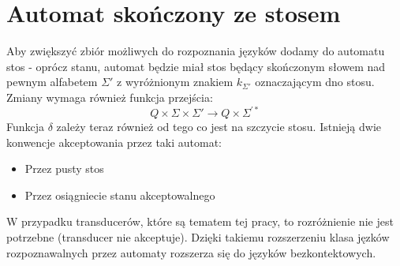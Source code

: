 \documentclass[declaration,shortabstract]{iithesis}
\theoremstyle{definition}
\theoremstyle{plain}
\begin{document}
\section{Automat skończony ze stosem}
Aby zwiększyć zbiór możliwych do rozpoznania języków dodamy do automatu stos - oprócz stanu, automat będzie miał stos będący skończonym słowem nad pewnym alfabetem \(\Sigma'\) z wyróżnionym znakiem \(k_{\Sigma'}\) oznaczającym dno stosu. Zmiany wymaga również funkcja przejścia:
$$ Q \times \Sigma \times \Sigma' \rightarrow  Q \times \Sigma^{'*}$$
Funkcja \( \delta \) zależy teraz również od tego co jest na szczycie stosu. Istnieją dwie konwencje akceptowania przez taki automat:
\begin{itemize}  
\item Przez pusty stos
\item Przez osiągniecie stanu akceptowalnego
\end{itemize}
W przypadku transducerów, które są tematem tej pracy, to rozróżnienie nie jest potrzebne (transducer nie akceptuje).
Dzięki takiemu rozszerzeniu klasa jęzków rozpoznawalnych przez automaty rozszerza się do języków bezkontektowych.
\end{document}
